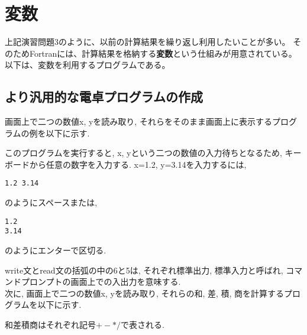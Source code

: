 \section{変数}
上記演習問題3のように、以前の計算結果を繰り返し利用したいことが多い。
そのためFortranには、計算結果を格納する{\bfseries 変数}という仕組みが用意されている。
以下は、変数を利用するプログラムである。



\subsection*{より汎用的な電卓プログラムの作成}
画面上で二つの数値x, yを読み取り, それらをそのまま画面上に表示するプログラムの例を以下に示す.

このプログラムを実行すると, x, yという二つの数値の入力待ちとなるため,
キーボードから任意の数字を入力する.
x=1.2, y=3.14を入力するには,
\begin{Verbatim}[frame=single]
1.2 3.14
\end{Verbatim}
のようにスペースまたは,
\begin{Verbatim}[frame=single]
1.2
3.14
\end{Verbatim}
のようにエンターで区切る.

write文とread文の括弧の中の6と5は,
それぞれ標準出力, 標準入力と呼ばれ, コマンドプロンプトの画面上での入出力を意味する. \\


次に, 画面上で二つの数値x, yを読み取り, それらの和, 差, 積, 商を計算するプログラムを以下に示す.

和差積商はそれぞれ記号$+-*/$で表される.
\\

\begin{comment}
最後に, 二つの数値をファイルから入力するように変更したプログラムを以下に示す.

プログラムの実行にあたっては, あらかじめ``input.dat"という入力ファイルを準備しておく必要がある.
メモ帳を用いて, ファイル``input.dat"をソースコードと同じフォルダ内に作成し, 例えば次のように入力しておくこと.
\begin{Verbatim}[frame=single]
1.2 3.14
\end{Verbatim}
\end{comment}

